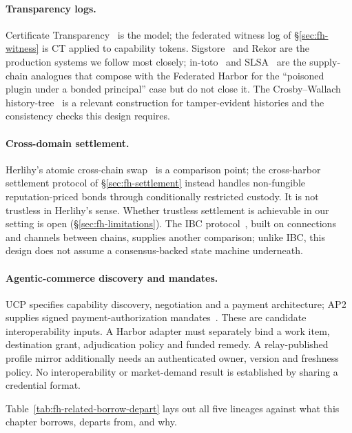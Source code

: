 \documentclass[11pt,a4paper]{article}
\theoremstyle{definition}
\theoremstyle{remark}
\begin{document}
\paragraph{Transparency logs.} Certificate Transparency~ is the model; the federated witness log of \S\ref{sec:fh-witness} is CT applied to capability tokens. Sigstore~ and Rekor are the production systems we follow most closely; in-toto~ and SLSA~ are the supply-chain analogues that compose with the Federated Harbor for the ``poisoned plugin under a bonded principal'' case but do not close it. The Crosby--Wallach history-tree~ is a relevant construction for tamper-evident histories and the consistency checks this design requires.

\paragraph{Cross-domain settlement.} Herlihy's atomic cross-chain swap~ is a comparison point; the cross-harbor settlement protocol of \S\ref{sec:fh-settlement} instead handles non-fungible reputation-priced bonds through conditionally restricted custody. It is not trustless in Herlihy's sense. Whether trustless settlement is achievable in our setting is open (\S\ref{sec:fh-limitations}). The IBC protocol~, built on connections and channels between chains, supplies another comparison; unlike IBC, this design does not assume a consensus-backed state machine underneath.

\paragraph{Agentic-commerce discovery and mandates.}
UCP specifies capability discovery, negotiation and a payment architecture;
AP2 supplies signed payment-authorization mandates~.
These are candidate interoperability inputs. A Harbor adapter must separately
bind a work item, destination grant, adjudication policy and funded remedy.
A relay-published profile mirror additionally needs an authenticated owner,
version and freshness policy. No interoperability or market-demand result is
established by sharing a credential format.

Table~\ref{tab:fh-related-borrow-depart} lays out all five lineages against what this chapter borrows, departs from, and why.
\end{document}
